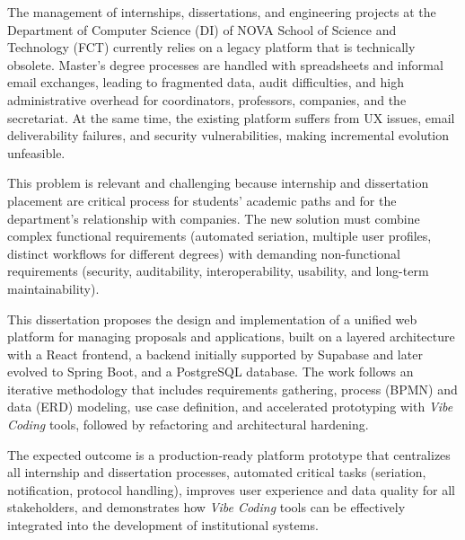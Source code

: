 
%

{
  The management of internships, dissertations, and engineering projects at the Department of Computer Science (DI) of NOVA School of Science and Technology (FCT)
  currently relies on a legacy platform that is technically obsolete.
  Master's degree processes are handled with spreadsheets and informal email exchanges, leading to fragmented data, audit difficulties, and high administrative overhead for coordinators,
  professors, companies, and the secretariat.
  At the same time, the existing platform suffers from UX issues, email deliverability failures, and security vulnerabilities, making incremental evolution unfeasible.
}

{
  This problem is relevant and challenging because internship and dissertation placement are critical process for students' academic paths and for the department's relationship
  with companies.
  The new solution must combine complex functional requirements (automated seriation, multiple user profiles, distinct workflows for different degrees) with demanding
  non-functional requirements (security, auditability, interoperability, usability, and long-term maintainability).
}

{
  This dissertation proposes the design and implementation of a unified web platform for managing proposals and applications, built on a layered architecture with a React frontend,
  a backend initially supported by Supabase and later evolved to Spring Boot, and a PostgreSQL database. 
  The work follows an iterative methodology that includes requirements gathering, process (BPMN) and data (ERD) modeling, use case definition, and accelerated prototyping with \textit{Vibe Coding} tools, 
  followed by refactoring and architectural hardening.
}

{
  The expected outcome is a production-ready platform prototype that centralizes all internship and dissertation processes,
  automated critical tasks (seriation, notification, protocol handling), improves user experience and data quality for all stakeholders, 
  and demonstrates how \textit{Vibe Coding} tools can be effectively integrated into the development of institutional systems.
}



